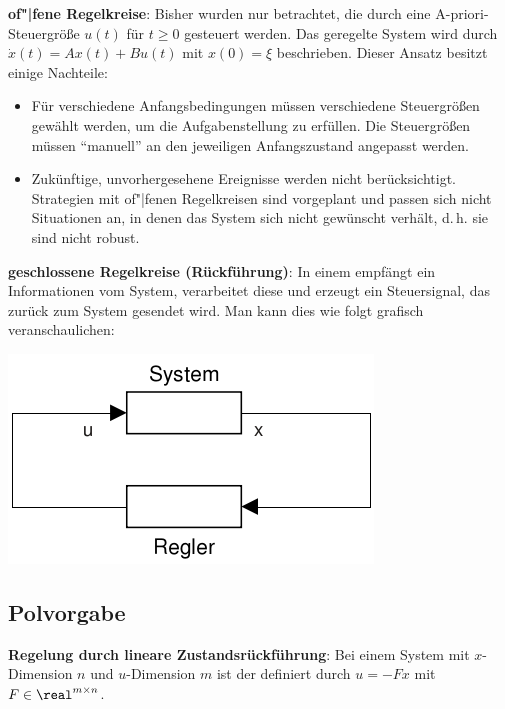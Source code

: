\textbf{of"|fene Regelkreise}:
Bisher wurden nur  betrachtet,
die durch eine A-priori-Steuergröße $u(t)$ für $t \ge 0$ gesteuert werden.
Das geregelte System wird durch $\dot{x}(t) = Ax(t) + Bu(t)$ mit $x(0) = \xi$ beschrieben.
Dieser Ansatz besitzt einige Nachteile:
\begin{itemize}
    \item
    Für verschiedene Anfangsbedingungen müssen verschiedene Steuergrößen gewählt werden,
    um die Aufgabenstellung zu erfüllen.
    Die Steuergrößen müssen "`manuell"' an den jeweiligen Anfangszustand angepasst werden.
    
    \item
    Zukünftige, unvorhergesehene Ereignisse werden nicht berücksichtigt.
    Strategien mit of"|fenen Regelkreisen sind vorgeplant und passen sich nicht Situationen an,
    in denen das System sich nicht gewünscht verhält, d.\,h. sie sind nicht robust.
\end{itemize}

\linie

\textbf{geschlossene Regelkreise (Rückführung)}:
In einem  empfängt ein
 Informationen vom System,
verarbeitet diese und erzeugt ein Steuersignal, das zurück zum System gesendet wird.
Man kann dies wie folgt grafisch veranschaulichen:

\begin{center}
    \includegraphics[scale=\modelscale]{rueckkopplung}
\end{center}

\pagebreak

\subsection{%
    Polvorgabe%
}

\textbf{Regelung durch lineare Zustandsrückführung}:
Bei einem System mit $x$-Dimension $n$ und $u$-Dimension $m$ ist
der  definiert
durch $u = -Fx$ mit $F \in \real^{m \times n}$.

